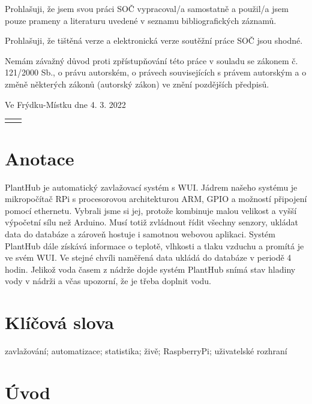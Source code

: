 \documentclass[11pt,a4paper]{article}
\begin{document}
Prohlašuji, že jsem svou práci SOČ vypracoval/a samostatně a použil/a jsem
pouze prameny a literaturu uvedené v seznamu bibliografických záznamů.

Prohlašuji, že tištěná verze a elektronická verze soutěžní práce SOČ jsou
shodné.

Nemám závažný důvod proti zpřístupňování této práce v souladu se zákonem č.
121/2000 Sb., o právu autorském, o právech souvisejících s právem autorským a o
změně některých zákonů (autorský zákon) ve znění pozdějších předpisů.

Ve Frýdku-Místku dne 4. 3. 2022

\begin{tabular}{@{}p{2.5in}p{2.5in}@{}}
	 & \dotfill
\end{tabular}

\clearpage

\section*{Anotace}

PlantHub je automatický zavlažovací systém s WUI.
Jádrem našeho systému je mikropočítač RPi s procesorovou architekturou ARM,
GPIO a možností připojení pomocí ethernetu.
Vybrali jsme si jej, protože kombinuje malou velikost a vyšší výpočetní sílu
než Arduino. Musí totiž zvládnout řídit všechny senzory, ukládat data do
databáze a zároveň hostuje i samotnou webovou aplikaci. Systém PlantHub dále
získává informace o teplotě, vlhkosti a tlaku vzduchu a promítá je ve svém
WUI. Ve stejné chvíli naměřená data ukládá do databáze v periodě 4
hodin. Jelikož voda časem z nádrže dojde systém PlantHub snímá stav hladiny
vody v nádrži a včas upozorní, že je třeba doplnit vodu.

\section*{Klíčová slova}

zavlažování; automatizace; statistika; živě; RaspberryPi; uživatelské rozhraní

\clearpage

\tableofcontents

\clearpage

\section{Úvod}
\end{document}
